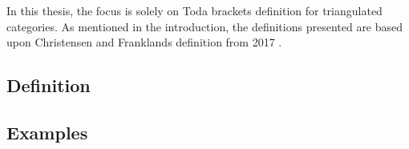 In this thesis, the focus is solely on Toda brackets definition for triangulated categories. As mentioned in the introduction, the definitions presented are based upon Christensen and Franklands definition from 2017 \cite[Definition 3.1]{Christensen-Frankland_2017}.

\subsection{Definition}


\subsection{Examples}
